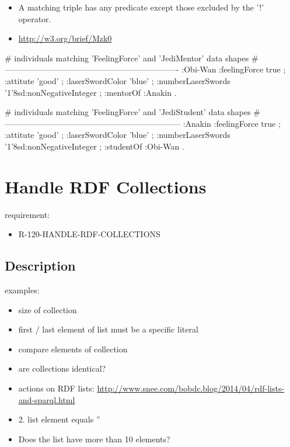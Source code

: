 \documentclass{llncs}
\begin{document}
\begin{itemize}
	\item A matching triple has any predicate except those excluded by the '!' operator.
  \item \url{http://w3.org/brief/Mzk0}
\end{itemize}

\begin{ex}
# individuals matching 'FeelingForce' and 'JediMentor' data shapes
# ----------------------------------------------------------------
:Obi-Wan 
    :feelingForce true ;
    :attitute 'good' ;
    :laserSwordColor 'blue' ;
    :numberLaserSwords '1'^^xsd:nonNegativeInteger ;
    :mentorOf :Anakin .
\end{ex}

\begin{ex}
# individuals matching 'FeelingForce' and 'JediStudent' data shapes
# -----------------------------------------------------------------
:Anakin 
    :feelingForce true ;
    :attitute 'good' ;
    :laserSwordColor 'blue' ;
    :numberLaserSwords '1'^^xsd:nonNegativeInteger ;
    :studentOf :Obi-Wan .
\end{ex}

\section{Handle RDF Collections}

requirement:

\begin{itemize}
	\item R-120-HANDLE-RDF-COLLECTIONS
\end{itemize}

\subsection{Description}

examples:

\begin{itemize}
	\item size of collection
	\item first / last element of list must be a specific literal
	\item compare elements of collection
	\item are collections identical?
	\item actions on RDF lists: \url{http://www.snee.com/bobdc.blog/2014/04/rdf-lists-and-sparql.html}
	\item 2. list element equals ''
	\item Does the list have more than 10 elements?
\end{itemize}
\end{document}

